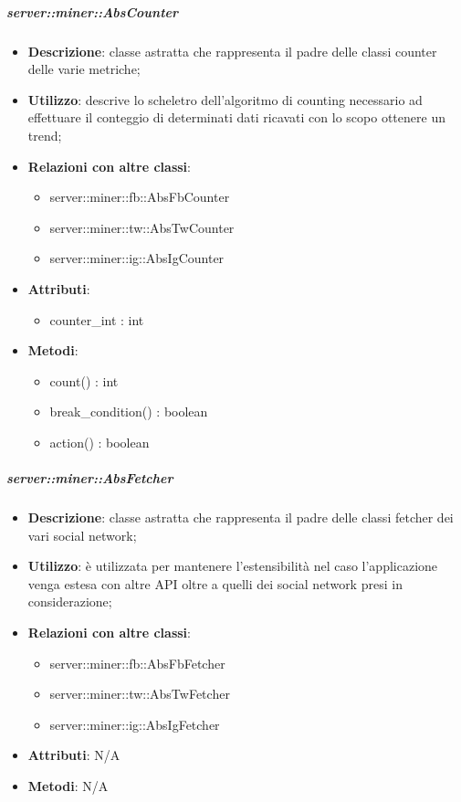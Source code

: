 		\subparagraph{server::miner::AbsCounter} %
		\label{subp:server_miner_AbsCounter}
			\begin{itemize}
				\item \textbf{Descrizione}: classe astratta che rappresenta il padre delle classi counter delle varie metriche;
				\item \textbf{Utilizzo}: descrive lo scheletro dell'algoritmo di counting necessario ad effettuare il conteggio di determinati dati ricavati con lo scopo ottenere un trend;
				\item \textbf{Relazioni con altre classi}:
					\begin{itemize}
						\item server::miner::fb::AbsFbCounter
						\item server::miner::tw::AbsTwCounter
						\item server::miner::ig::AbsIgCounter
					\end{itemize}
				\item \textbf{Attributi}: 
					\begin{itemize}
						\item counter\_int : int
					\end{itemize}
				\item \textbf{Metodi}:   
					\begin{itemize}
						\item count() : int
						\item break\_condition() : boolean
						\item action() : boolean
					\end{itemize}
			\end{itemize}

		\subparagraph{server::miner::AbsFetcher} %
		\label{subp:server_miner_AbsFetcher}
				\begin{itemize}
				\item \textbf{Descrizione}: classe astratta che rappresenta il padre delle classi fetcher dei vari social network;
				\item \textbf{Utilizzo}: è utilizzata per mantenere l'estensibilità nel caso l'applicazione venga estesa con altre API  oltre a quelli dei social network presi in considerazione;
				\item \textbf{Relazioni con altre classi}:
					\begin{itemize}
						\item server::miner::fb::AbsFbFetcher
						\item server::miner::tw::AbsTwFetcher
						\item server::miner::ig::AbsIgFetcher
					\end{itemize}
				\item \textbf{Attributi}: N/A
				\item \textbf{Metodi}: N/A
			\end{itemize}

